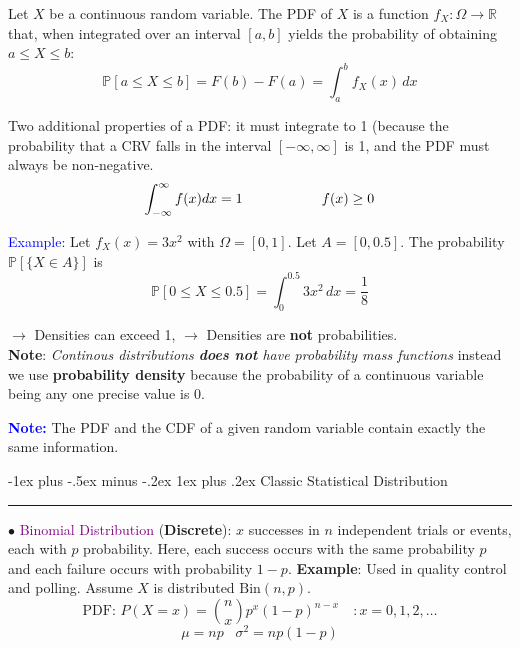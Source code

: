 \documentclass[letterpaper, 10.5pt,landscape]{article}
\makeatletter
\renewcommand{\subsubsection}{\@startsection{subsubsection}{3}{0mm}%
                                {-1ex plus -.5ex minus -.2ex}%
                                {1ex plus .2ex}%
                                {\normalfont\small\bfseries}}
\makeatother
\begin{document}
\begin{multicols*}{3}
   
Let $X$ be a continuous random variable. The  PDF of $X$ is a function \(f_{X}: \Omega \rightarrow \mathbb{R}\) that, when integrated over an interval $[a,b]$ yields the probability of obtaining $a \leq X \leq b:$
\[\boxed{\mathbb{P}[a\leq X \leq b] = F(b) - F(a) = \int_{a}^{b} f_{X}(x) \hspace{2pt} dx} \]



Two additional properties of a PDF:  it must integrate to 1 (because the probability that a CRV falls in the interval $[-\infty, \infty]$ is 1, and the PDF must always be non-negative.
\[\int^\infty_{-\infty}f(x)dx = 1 \hspace{2 cm} f(x) \geq 0\]



\textcolor{blue}{Example}: Let $f_{X}(x) = 3x^{2}$ with $\Omega = [0,1]$. Let $A=[0,0.5]$. The probability $\mathbb{P}[\{X \in A \}]$ is 
\vspace{-3pt}
\[\mathbb{P}[0 \leq X \leq 0.5] = \int_{0}^{0.5} 3x^{2} \hspace{2pt} dx = \frac{1}{8}\]




$\rightarrow$ Densities can exceed 1, $\rightarrow$ Densities are \textbf{not} probabilities. \\

\textbf{Note}: \textit{Continous distributions \textbf{does not} have probability mass functions} instead we use \textbf{probability density} because the probability of a continuous variable being any one precise value is 0.

\textbf{\textcolor{blue}{Note:} } The PDF and the CDF of a given random variable contain exactly the same information.









\subsubsection{Classic Statistical Distribution}{\color{teal}\hrule height 0.5pt} \smallskip

$\bullet$ \textcolor{purple}{Binomial Distribution} (\textbf{Discrete}): $x$ successes in $n$ independent trials or events, each with $p$ probability. Here, each success occurs with the same probability $p$ and each failure occurs with probability $1-p$. \textbf{Example}: Used in quality control and polling. Assume $X$ is distributed \(\text{Bin}(n,p) \). 
\vspace{-3pt}
\[\boxed{\text{PDF: } P(X=x) =  \binom{n}{x}  p^x (1-p)^{n-x} \quad : x = 0,1,2,\ldots }\]
\vspace{-5pt}
\[\boxed{\mu = np} \hspace{10pt} \boxed{\sigma^{2} = np(1-p)}\]



\end{multicols*}
\end{document}
